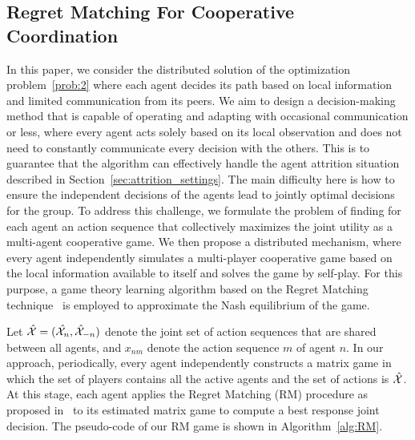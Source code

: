 \subsection{Regret Matching For Cooperative Coordination}

In this paper, we consider the distributed solution of the optimization problem~\ref{prob:2} where each agent decides its path based on local information and limited communication from its peers. We aim to design a decision-making method that is capable of operating and adapting with occasional communication or less, where every agent acts solely based on its local observation and does not need to constantly communicate every decision with the others. This is to guarantee that the algorithm can effectively handle the agent attrition situation described in Section~\ref{sec:attrition_settings}. The main difficulty here is how to ensure the independent decisions of the agents lead to jointly optimal decisions for the group. To address this challenge, we formulate the problem of finding for each agent an action sequence that collectively maximizes the joint utility as a multi-agent cooperative game. We then propose a distributed mechanism, where every agent independently simulates a multi-player cooperative game based on the local information available to itself and solves the game by self-play. For this purpose, a game theory learning algorithm based on the Regret Matching technique~\citep{hart2000simple} is employed to approximate the Nash equilibrium of the game.

Let $\hat{\mathcal{X}}=(\hat{\mathcal{X}_n},\hat{\mathcal{X}}_{-n})$ denote the joint set of action sequences that are shared between all agents, and $x_{nm}$ denote the action sequence $m$ of agent $n$. In our approach, periodically, every agent independently constructs a matrix game in which the set of players contains all the active agents and the set of actions is $\hat{\mathcal{X}}$. At this stage, each agent applies the Regret Matching (RM) procedure as proposed in~\citep{hart2000simple} to its estimated matrix game to compute a best response joint decision. The pseudo-code of our RM game is shown in Algorithm~\ref{alg:RM}.

